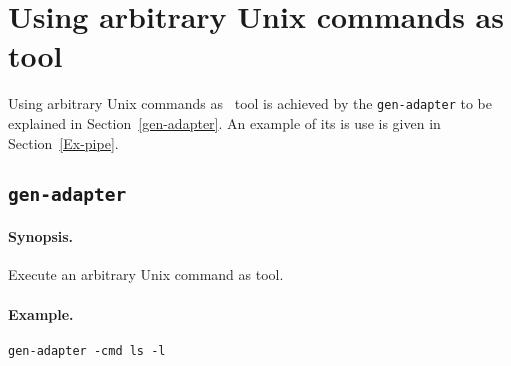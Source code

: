 
\section{\label{ToolsFromUnix}Using arbitrary Unix commands as tool}

Using arbitrary Unix commands as \TB\ tool is achieved by the {\tt gen-adapter}
to be explained in Section~\ref{gen-adapter}.
An example of its is use is given in Section~\ref{Ex-pipe}.


\subsection{\label{gen-adapter}{\tt gen-adapter}}

\paragraph{Synopsis.} Execute an arbitrary Unix command as tool.

\paragraph{Example.} {\tt gen-adapter -cmd ls -l}


